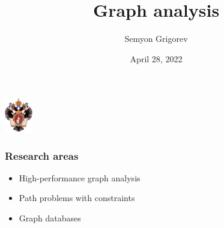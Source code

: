 \documentclass[xcolor=table,aspectratio=169]{beamer}
\title[Graph analysis]{Graph analysis}
\institute[PL\&T@SPbSU]{
Saint Petersburg State University
}
\author[Semyon Grigorev]{Semyon Grigorev}
\date{April 28, 2022}
\begin{document}
{
\begin{frame}[fragile]
  \begin{table}
  \centering
  \includegraphics[height=1.5cm]{pictures/SPbGU_Logo.png}
  \end{table}
  \titlepage
\end{frame}
}

\begin{frame}[fragile]
  \frametitle{Research areas}  
  \begin{itemize}
    \item High-performance graph analysis
      
    \item Path problems with constraints
    
    \item Graph databases
    
    \end{itemize}
\end{frame}
\end{document}
